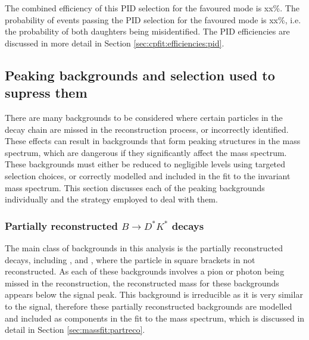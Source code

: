 The combined efficiency of this PID selection for the \kpi favoured mode is xx\%. The probability of \pik events passing the PID selection for the favoured mode is xx\%, i.e. the probability of both \Dz daughters being misidentified. The PID efficiencies are discussed in more detail in Section \ref{sec:cpfit:efficiencies:pid}. 

\subsection{Peaking backgrounds and selection used to supress them}
\label{sec:backgrounds}

There are many backgrounds to be considered where certain particles in the decay chain are missed in the reconstruction process, or incorrectly identified. These effects can result in backgrounds that form peaking structures in the \Bm mass spectrum, which are dangerous if they significantly affect the \Bm mass spectrum. These backgrounds must either be reduced to negligible levels using targeted selection choices, or correctly modelled and included in the fit to the invariant \Bm mass spectrum. This section discusses each of the peaking backgrounds individually and the strategy employed to deal with them.

\subsubsection{Partially reconstructed \boldmath$B \to D^*K^*$ decays}
\label{sec:backgrounds:partreco}

The main class of backgrounds in this analysis is the partially reconstructed \decay{\B}{\Dstar\Kstar} decays, including \decay{\Bm}{(\decay{\Dstarz}{\Dz[\piz]})\Kstarm}, \decay{\Bm}{(\decay{\Dstarz}{\Dz[\gamma]})\Kstarm} and \decay{\Bd}{(\decay{\Dstarp}{\Dz[\pip]})\Kstarm}, where the particle in square brackets in not reconstructed. As each of these backgrounds involves a pion or photon being missed in the reconstruction, the reconstructed \Bm mass for these backgrounds appears below the signal peak. This background is irreducible as it is very similar to the signal, therefore these partially reconstructed backgrounds are modelled and included as components in the fit to the \Bm mass spectrum, which is discussed in detail in Section \ref{sec:massfit:partreco}.

